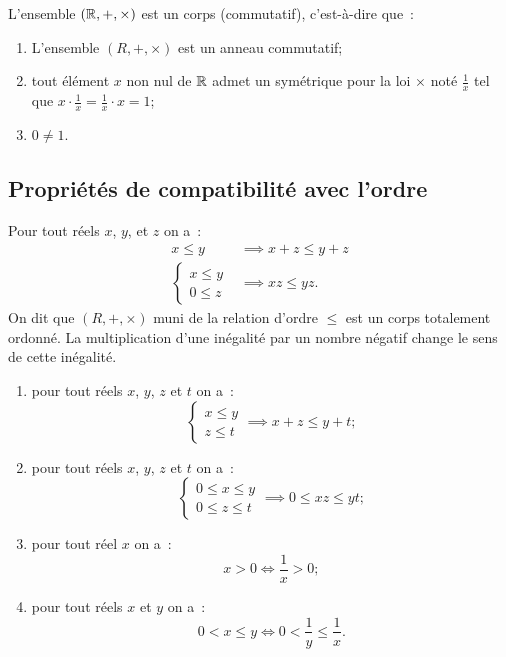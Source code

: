 \begin{prop}
  L'ensemble \((\mathbb{R},+,\times)\) est un corps (commutatif), c'est-à-dire que~:
  \begin{enumerate}
  \item L'ensemble \((R,+,\times)\) est un anneau commutatif;
  \item tout élément \(x\) non nul de \(\mathbb{R}\) admet un symétrique pour la loi \(\times\) noté \(\frac{1}{x}\) tel que \(x\cdot \frac{1}{x}=\frac{1}{x}\cdot x=1\);
  \item \(0\neq 1\).
  \end{enumerate}
\end{prop}

\subsection{Propriétés de compatibilité avec l'ordre}

\begin{prop}
  Pour tout réels \(x\), \(y\), et \(z\) on a~:
  \begin{align}
    x\leqslant y &\implies x+z\leqslant y+z \\
    \begin{cases} x\leqslant y \\ 0\leqslant z \end{cases} &\implies xz \leqslant yz.
  \end{align}
On dit que \((R,+,\times)\) muni de la relation d'ordre \(\leqslant\) est un corps totalement ordonné. La multiplication d'une inégalité par un nombre négatif change le sens de cette inégalité.
\end{prop}
\begin{enumerate}
\item pour tout réels \(x\), \(y\), \(z\) et \(t\) on a~:
  \begin{equation}
    \begin{cases}x\leqslant y \\ z \leqslant t \end{cases} \implies x+z\leqslant y+t;
  \end{equation}
\item pour tout réels \(x\), \(y\), \(z\) et \(t\) on a~:
  \begin{equation}
    \begin{cases}0\leqslant x\leqslant y \\ 0 \leqslant z \leqslant t \end{cases} \implies 0\leqslant xz \leqslant yt;
  \end{equation}
\item pour tout réel \(x\) on a~:
  \begin{equation}
    x>0 \iff \frac{1}{x}>0;
  \end{equation}
\item pour tout réels \(x\) et \(y\) on a~:
  \begin{equation}
    0<x\leqslant y \iff 0<\frac{1}{y}\leqslant \frac{1}{x}.
  \end{equation}
\end{enumerate}

